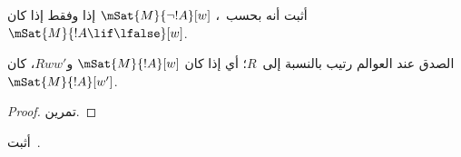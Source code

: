 \documentclass[../../../include/open-logic-section]{subfiles}
\begin{document}
\begin{prob}
  أثبت أنه بحسب~،
  $\mSat{M}{\lnot !A}[w]$ إذا وفقط إذا كان
  $\mSat{M}{!A \lif \lfalse}[w]$.
\end{prob}

\begin{prop}
  الصدق عند العوالم رتيب بالنسبة إلى~$R$؛ أي إذا كان
  $\mSat{M}{!A}[w]$ و$Rww'$، كان~$\mSat{M}{!A}[w']$.
\end{prop}

\begin{proof}
  تمرين.
\end{proof}

\begin{prob}
  أثبت~.
\end{prob}
\end{document}
